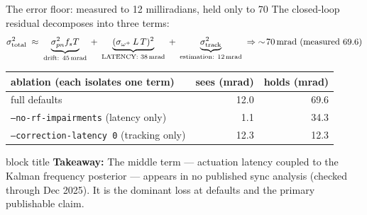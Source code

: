 \documentclass[aspectratio=169,10pt]{beamer}
\newcommand{\takeaway}[1]{%
  \vspace{2pt}\begin{beamercolorbox}[rounded=true,sep=4pt]{block title}%
  \small\textbf{Takeaway:} #1\end{beamercolorbox}}
\begin{document}
\begin{frame}{The error floor: measured to 12 milliradians, held only to 70}
  \small The closed-loop residual decomposes into three terms:
  \[
    \sigma^2_{\rm total}\;\approx\;
    \underbrace{\sigma_{pn}^2 f_s T}_{\text{drift: }45\,\mathrm{mrad}}
    \;+\;
    \underbrace{(\sigma_{\omega^+}\, L\, T)^2}_{\text{LATENCY: }38\,\mathrm{mrad}}
    \;+\;
    \underbrace{\sigma^2_{\rm track}}_{\text{estimation: }12\,\mathrm{mrad}}
    \;\Rightarrow\;\sim\!70\,\mathrm{mrad\ (measured\ 69.6)}
  \]
  \begin{center}
  \begin{tabular}{@{}lrr@{}}
    \toprule
    ablation (each isolates one term) & sees (mrad) & holds (mrad) \\
    \midrule
    full defaults & 12.0 & 69.6 \\
    \texttt{--no-rf-impairments} (latency only) & 1.1 & 34.3 \\
    \texttt{--correction-latency 0} (tracking only) & 12.3 & 12.3 \\
    \bottomrule
  \end{tabular}
  \end{center}
  \takeaway{The middle term --- actuation latency coupled to the
  Kalman frequency posterior --- appears in no published sync
  analysis (checked through Dec 2025). It is the dominant loss at
  defaults and the primary publishable claim.}
\end{frame}
\end{document}
